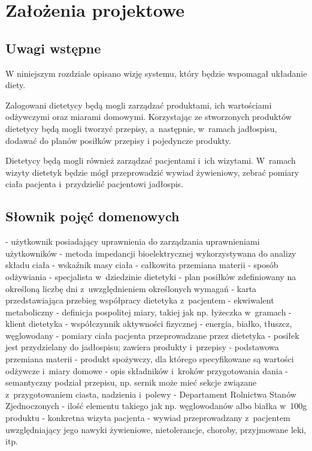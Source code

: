 \chapter{Założenia projektowe}\label{ch:design-assumptions}
\section{Uwagi wstępne}\label{sec:presumptions}
W niniejszym rozdziale opisano wizję systemu, który będzie wspomagał układanie diety.
\par
Zalogowani dietetycy będą mogli zarządzać produktami, ich wartościami odżywczymi oraz
miarami domowymi. Korzystając ze stworzonych produktów dietetycy będą mogli tworzyć
przepisy, a~następnie, w~ramach jadłospisu, dodawać do planów posiłków przepisy
i pojedyncze produkty.
\par
Dietetycy będą mogli również zarządzać pacjentami i~ich wizytami. W~ramach wizyty dietetyk
będzie mógł przeprowadzić wywiad żywieniowy, zebrać pomiary ciała pacjenta i~przydzielić
pacjentowi jadłospis.


\section{Słownik pojęć domenowych}\label{sec:dictionary}
\begin{itemize}[series=atr, wide, align=left, leftmargin=190pt]
    - użytkownik posiadający uprawnienia do zarządzania uprawnieniami użytkowników
    - metoda impedancji bioelektrycznej wykorzystywana do analizy składu ciała%
    - wskaźnik masy ciała%
    - całkowita przemiana materii %
    - sposób odżywiania%
    - specjalista w~dziedzinie dietetyki
    - plan posiłków zdefiniowany na określoną liczbę dni z~uwzględnieniem określonych wymagań
    - karta przedstawiająca przebieg współpracy dietetyka z~pacjentem
    - ekwiwalent metaboliczny%
    - definicja pospolitej miary, takiej jak np. łyżeczka w~gramach
    - klient dietetyka
    - współczynnik aktywności fizycznej
    - energia, białko, tłuszcz, węglowodany%
    - pomiary ciała pacjenta przeprowadzane przez dietetyka
    - posiłek jest przydzielany do jadłospisu; zawiera produkty i~przepisy
    - podstawowa przemiana materii %
    - produkt spożywczy, dla którego specyfikowane są wartości odżywcze i~miary domowe
    - opis składników i~kroków przygotowania dania
    - semantyczny podział przepisu, np. sernik może mieć sekcje związane z~przygotowaniem ciasta, nadzienia i~polewy
    - Departament Rolnictwa Stanów Zjednoczonych%
    - ilość elementu takiego jak np. węglowodanów albo białka w~100g produktu
    - konkretna wizyta pacjenta
    - wywiad przeprowadzany z~pacjentem uwzględniający jego nawyki żywieniowe, nietolerancje, choroby, przyjmowane leki, itp.
\end{itemize}

